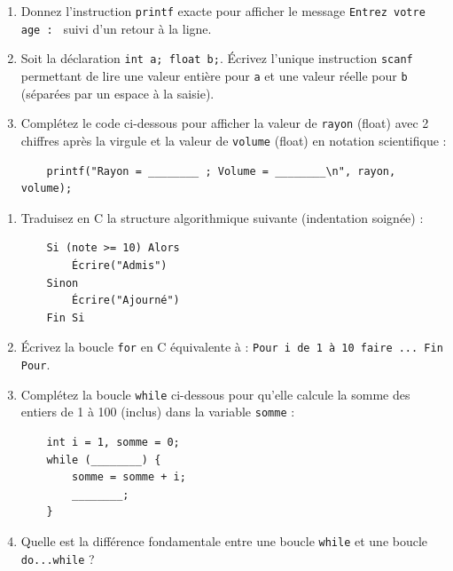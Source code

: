 \documentclass[11pt]{article}
\begin{document}
\begin{exercice}
\begin{enumerate}
    \item Donnez l'instruction \texttt{printf} exacte pour afficher le message \texttt{Entrez votre age : } suivi d'un retour à la ligne.
    \item Soit la déclaration \texttt{int a; float b;}. Écrivez l'unique instruction \texttt{scanf} permettant de lire une valeur entière pour \texttt{a} et une valeur réelle pour \texttt{b} (séparées par un espace à la saisie).
    \item Complétez le code ci-dessous pour afficher la valeur de \texttt{rayon} (float) avec 2 chiffres après la virgule et la valeur de \texttt{volume} (float) en notation scientifique :
    \begin{verbatim}
    printf("Rayon = ________ ; Volume = ________\n", rayon, volume);
    \end{verbatim}
\end{enumerate}
\end{exercice}

\begin{exercice}
\begin{enumerate}
    \item Traduisez en C la structure algorithmique suivante (indentation soignée) :
    \begin{verbatim}
    Si (note >= 10) Alors
        Écrire("Admis")
    Sinon
        Écrire("Ajourné")
    Fin Si
    \end{verbatim}
    \item Écrivez la boucle \texttt{for} en C équivalente à : \texttt{Pour i de 1 à 10 faire ... Fin Pour}.
    \item Complétez la boucle \texttt{while} ci-dessous pour qu'elle calcule la somme des entiers de 1 à 100 (inclus) dans la variable \texttt{somme} :
    \begin{verbatim}
    int i = 1, somme = 0;
    while (________) {
        somme = somme + i;
        ________;
    }
    \end{verbatim}
    \item Quelle est la différence fondamentale entre une boucle \texttt{while} et une boucle \texttt{do...while} ?
\end{enumerate}
\end{exercice}
\end{document}
